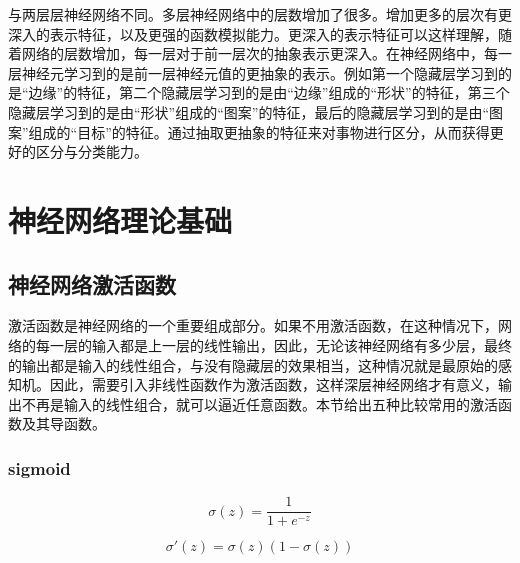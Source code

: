 \documentclass[UTF-8]{progbookcn}
\begin{document}
与两层层神经网络不同。多层神经网络中的层数增加了很多。增加更多的层次有更深入的表示特征，以及更强的函数模拟能力。更深入的表示特征可以这样理解，随着网络的层数增加，每一层对于前一层次的抽象表示更深入。在神经网络中，每一层神经元学习到的是前一层神经元值的更抽象的表示。例如第一个隐藏层学习到的是“边缘”的特征，第二个隐藏层学习到的是由“边缘”组成的“形状”的特征，第三个隐藏层学习到的是由“形状”组成的“图案”的特征，最后的隐藏层学习到的是由“图案”组成的“目标”的特征。通过抽取更抽象的特征来对事物进行区分，从而获得更好的区分与分类能力。
%
%


\chapter{神经网络理论基础}

\section{神经网络激活函数}
激活函数是神经网络的一个重要组成部分。如果不用激活函数，在这种情况下，网络的每一层的输入都是上一层的线性输出，因此，无论该神经网络有多少层，最终的输出都是输入的线性组合，与没有隐藏层的效果相当，这种情况就是最原始的感知机。因此，需要引入非线性函数作为激活函数，这样深层神经网络才有意义，输出不再是输入的线性组合，就可以逼近任意函数\cite{DBLP:books/daglib/0040158}。本节给出五种比较常用的激活函数及其导函数。

\subsection{sigmoid\cite{DBLP:journals/mcss/Cybenko89}}
\begin{equation}\label{E11}
  \sigma(z) = \frac{1}{1+e^{-z}}
\end{equation}

\begin{equation}\label{E12}
  \sigma'(z) = \sigma(z)(1-\sigma(z))
\end{equation}
\end{document}
